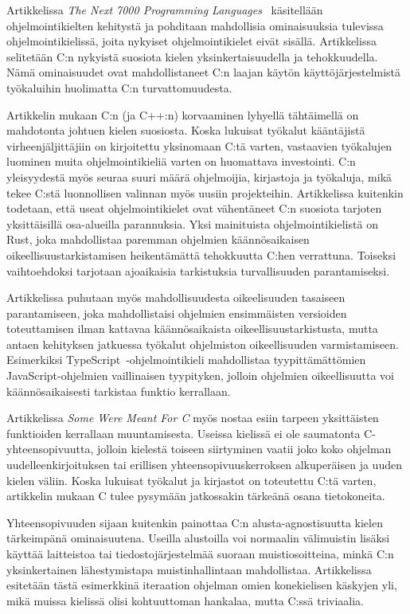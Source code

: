 Artikkelissa \emph{The Next 7000 Programming Languages}~\citep{next7000}
käsitellään ohjelmointikielten kehitystä ja pohditaan mahdollisia ominaisuuksia
tulevissa ohjelmointikielissä, joita nykyiset ohjelmointikielet eivät sisällä.
Artikkelissa selitetään C:n nykyistä suosiota kielen yksinkertaisuudella ja
tehokkuudella. Nämä ominaisuudet ovat mahdollistaneet C:n laajan käytön
käyttöjärjestelmistä työkaluihin huolimatta C:n turvattomuudesta.

Artikkelin mukaan C:n (ja C++:n) korvaaminen lyhyellä tähtäimellä on mahdotonta
johtuen kielen suosiosta. Koska lukuisat työkalut kääntäjistä
virheenjäljittäjiin on kirjoitettu yksinomaan C:tä varten,
vastaavien työkalujen luominen muita ohjelmointikieliä varten on huomattava
investointi. C:n yleisyydestä myös seuraa suuri määrä ohjelmoijia, kirjastoja
ja työkaluja, mikä tekee C:stä luonnollisen valinnan myös uusiin projekteihin.
Artikkelissa kuitenkin todetaan, että useat ohjelmointikielet ovat vähentäneet
C:n suosiota tarjoten yksittäisillä osa-alueilla parannuksia. Yksi mainituista
ohjelmointikielistä on Rust, joka mahdollistaa paremman ohjelmien
käännösaikaisen oikeellisuustarkistamisen heikentämättä tehokkuutta C:hen
verrattuna. Toiseksi vaihtoehdoksi tarjotaan ajoaikaisia tarkistuksia
turvallisuuden parantamiseksi.

Artikkelissa puhutaan myös mahdollisuudesta oikeelisuuden tasaiseen
parantamiseen, joka mahdollistaisi ohjelmien
ensimmäisten versioiden toteuttamisen ilman kattavaa käännösaikaista
oikeellisuustarkistusta, mutta antaen kehityksen jatkuessa työkalut ohjelmiston
oikeellisuuden varmistamiseen. Esimerkiksi
TypeScript~\citep{typescript}-ohjelmointikieli mahdollistaa tyypittämättömien
JavaScript-ohjelmien vaillinaisen tyypityken, jolloin
ohjelmien oikeellisuutta voi käännösaikaisesti tarkistaa funktio kerrallaan. 

Artikkelissa \emph{Some Were Meant For C} \citet{somemeantforc} myös nostaa
esiin tarpeen yksittäisten funktioiden kerrallaan muuntamisesta. Useissa
kielissä ei ole saumatonta C-yhteensopivuutta, jolloin kielestä toiseen
siirtyminen vaatii joko koko ohjelman uudelleenkirjoituksen tai erillisen
yhteensopivuuskerroksen alkuperäisen ja uuden kielen väliin. Koska lukuisat
työkalut ja kirjastot on toteutettu C:tä varten, artikkelin mukaan C tulee
pysymään jatkossakin tärkeänä osana tietokoneita.

Yhteensopivuuden sijaan \citeauthor{somemeantforc} kuitenkin painottaa C:n
alusta-agnostisuutta kielen tärkeimpänä ominaisuutena. Useilla alustoilla
voi normaalin välimuistin lisäksi käyttää laitteistoa tai tiedostojärjestelmää
suoraan muistiosoitteina, minkä C:n yksinkertainen lähestymistapa
muistinhallintaan mahdollistaa. Artikkelissa esitetään tästä esimerkkinä
iteraation ohjelman omien konekielisen käskyjen yli, mikä muissa kielissä olisi
kohtuuttoman hankalaa, mutta C:ssä triviaalia.

